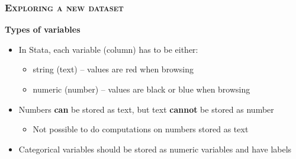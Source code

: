 \documentclass[10pt]{beamer}
\begin{document}
	\begin{frame}
		\frametitle{\textsc{Exploring a new dataset}}
		\begin{center}
			\Large\textbf{Types of variables}
		\end{center}
		\begin{itemize}
			\item 	In Stata, each variable (column) has to be either:
			\begin{itemize}
				\item string (text) – values are red when browsing
				\item numeric (number) – values are black or blue when browsing
			\end{itemize}
			\item Numbers \textbf{can} be stored as text, but text \textbf{cannot} be stored as number
			\begin{itemize}
				\item Not possible to do computations on numbers stored as text 		
			\end{itemize}
			\item Categorical variables should be stored as numeric variables and have labels
		\end{itemize}
	\end{frame}
\end{document}
